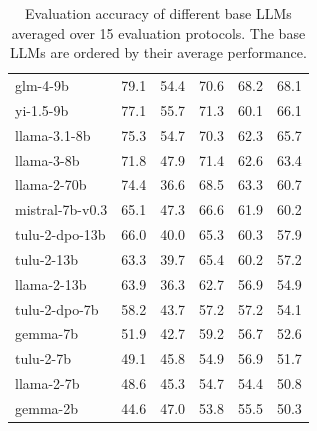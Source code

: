\documentclass[11pt]{article}
\begin{document}
\begin{table}[t!]
\begin{tabular}{@{}lccccc@{}}
 glm-4-9b        & 79.1             & 54.4                 & 70.6          & 68.2            & 68.1          \\
 yi-1.5-9b       & 77.1             & 55.7                 & 71.3          & 60.1            & 66.1          \\
 llama-3.1-8b    & 75.3             & 54.7                 & 70.3          & 62.3            & 65.7          \\
 llama-3-8b      & 71.8             & 47.9                 & 71.4          & 62.6            & 63.4          \\
 llama-2-70b     & 74.4             & 36.6                 & 68.5          & 63.3            & 60.7          \\
 mistral-7b-v0.3 & 65.1             & 47.3                 & 66.6          & 61.9            & 60.2          \\
 tulu-2-dpo-13b  & 66.0             & 40.0                 & 65.3          & 60.3            & 57.9          \\
 tulu-2-13b      & 63.3             & 39.7                 & 65.4          & 60.2            & 57.2          \\
 llama-2-13b     & 63.9             & 36.3                 & 62.7          & 56.9            & 54.9          \\
 tulu-2-dpo-7b   & 58.2             & 43.7                 & 57.2          & 57.2            & 54.1          \\
 gemma-7b        & 51.9             & 42.7                 & 59.2          & 56.7            & 52.6          \\
 tulu-2-7b       & 49.1             & 45.8                 & 54.9          & 56.9            & 51.7          \\
 llama-2-7b      & 48.6             & 45.3                 & 54.7          & 54.4            & 50.8          \\
 gemma-2b        & 44.6             & 47.0                 & 53.8          & 55.5            & 50.3          \\
\bottomrule
\end{tabular}
\addtolength{\tabcolsep}{-1pt} 
\caption{Evaluation accuracy of different base LLMs averaged over 15 evaluation protocols. The base LLMs are ordered by their average performance.
}
\label{tab:models} 
\end{table}
\end{document}
